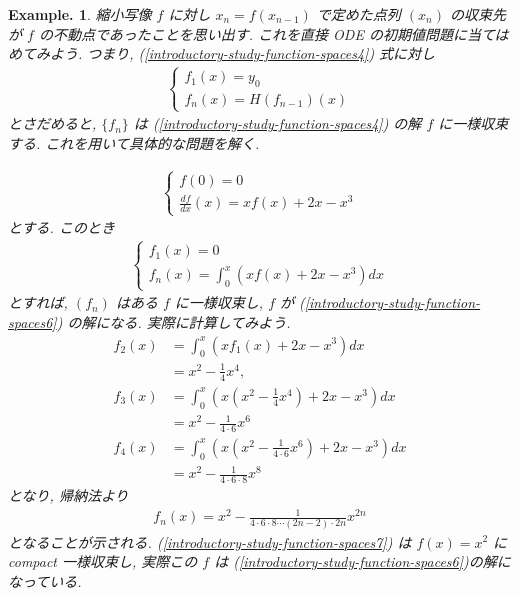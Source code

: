 \documentclass[openany, a4paper, oneside]{jsbook}
\theoremstyle{break}
\theoremstyle{breakdefn}
\newtheorem{ex}[thm]{Example.}
\newcommand{\rbk}[1]{\left (#1\right)}
\begin{document}
\begin{ex}
縮小写像 $f$ に対し $x_n=f(x_{n - 1})$ で定めた点列 $\rbk{x_n}$ の収束先が $f$ の不動点であったことを思い出す.
これを直接 ODE の初期値問題に当てはめてみよう.
つまり, (\ref{introductory-study-function-spaces4}) 式に対し
\begin{align*}
 \begin{cases}
  f_1(x)
  =
  y_0 \\
  f_n(x)
  =
  H(f_{n - 1})(x)
 \end{cases}
\end{align*}
とさだめると,  $\{f_n\}$ は (\ref{introductory-study-function-spaces4}) の解 $f$ に一様収束する.
これを用いて具体的な問題を解く.

\begin{align}
 \begin{cases}
  f(0)
  =
  0 \\
  \frac{df}{dx}(x)
  =
  x f(x) + 2x - x^3
 \end{cases}\label{introductory-study-function-spaces6}
\end{align}
とする.
このとき
\begin{align*}
 \begin{cases}
  f_1(x)
  =
  0 \\
  f_n(x)
  =
  \int_{0}^{x} \rbk{x f(x) + 2x - x^3} dx
 \end{cases}
\end{align*}
とすれば,  $\rbk{f_n}$ はある $f$ に一様収束し,
$f$ が (\ref{introductory-study-function-spaces6}) の解になる.
実際に計算してみよう.
\begin{align*}
 f_2(x)
 &=
 \int_0^x \rbk{x f_1(x) + 2x - x^3} dx \\
 &=
 x^2 - \frac{1}{4} x^4, \\
 f_3(x)
 &=
 \int_0^x \rbk{x \rbk{x^2 - \frac{1}{4} x^4} + 2x - x^3} dx \\
 &=
 x^2 - \frac{1}{4 \cdot 6} x^6 \\
 f_4(x)
 &=
 \int_0^x \rbk{x \rbk{x^2 - \frac{1}{4 \cdot 6} x^6} + 2x - x^3} dx \\
 &=
 x^2 - \frac{1}{4 \cdot 6\cdot 8} x^8
\end{align*}
となり, 帰納法より
\begin{align}
 f_n(x)
 =
 x^2 - \frac{1}{4 \cdot 6 \cdot 8 \cdots (2n - 2) \cdot 2n} x^{2n} \label{introductory-study-function-spaces7}
\end{align}
となることが示される.
(\ref{introductory-study-function-spaces7}) は $f(x)=x^2$ に compact 一様収束し,
実際この $f$ は (\ref{introductory-study-function-spaces6})の解になっている.
\end{ex}
\end{document}
